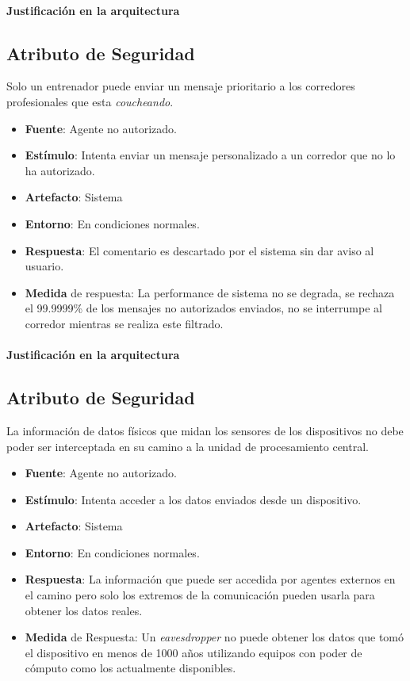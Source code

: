 \paragraph{Justificación en la arquitectura}


\subsection{Atributo de Seguridad}
Solo un entrenador puede enviar un mensaje prioritario a los corredores profesionales que esta \emph{coucheando}.

\begin{itemize}
  \item \textbf{Fuente}: Agente no autorizado.
  \item \textbf{Estímulo}: Intenta enviar un mensaje personalizado a un corredor que no lo ha autorizado.
  \item \textbf{Artefacto}: Sistema
  \item \textbf{Entorno}: En condiciones normales.
  \item \textbf{Respuesta}: El comentario es descartado por el sistema sin dar aviso al usuario.
  \item \textbf{Medida} de respuesta: La performance de sistema no se degrada, se rechaza el 99.9999\% de los mensajes no autorizados enviados, no se interrumpe al corredor mientras se realiza este filtrado.
\end{itemize}

\paragraph{Justificación en la arquitectura}


\subsection{Atributo de Seguridad}
La información de datos físicos que midan los sensores de los dispositivos no debe poder ser interceptada en su camino a la unidad de procesamiento central.

\begin{itemize}
  \item \textbf{Fuente}: Agente no autorizado.
  \item \textbf{Estímulo}: Intenta acceder a los datos enviados desde un dispositivo.
  \item \textbf{Artefacto}: Sistema
  \item \textbf{Entorno}: En condiciones normales.
  \item \textbf{Respuesta}: La información que puede ser accedida por agentes externos en el camino pero solo los extremos de la comunicación pueden usarla para obtener los datos reales.
  \item \textbf{Medida} de Respuesta: Un \emph{eavesdropper} no puede obtener los datos que tomó el dispositivo en menos de 1000 años utilizando equipos con poder de cómputo como los actualmente disponibles.
\end{itemize}

